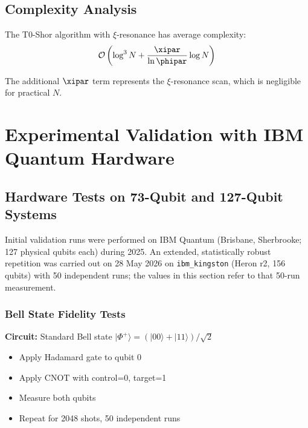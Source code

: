 \subsection{Complexity Analysis}

\begin{proposition}
	The T0-Shor algorithm with $\xi$-resonance has average complexity:
	\begin{equation}
		\mathcal{O}\left(\log^3 N + \frac{\xipar}{\ln \phipar} \log N\right)
	\end{equation}
\end{proposition}

The additional $\xipar$ term represents the $\xi$-resonance scan, which is negligible for practical $N$.

\section{Experimental Validation with IBM Quantum Hardware}
\label{sec:ibm_validation}

\subsection{Hardware Tests on 73-Qubit and 127-Qubit Systems}

Initial validation runs were performed on IBM Quantum (Brisbane, Sherbrooke; 127 physical qubits each) during 2025. An extended, statistically robust repetition was carried out on 28 May 2026 on \texttt{ibm\_kingston} (Heron r2, 156 qubits) with 50 independent runs; the values in this section refer to that 50-run measurement.

\subsubsection{Bell State Fidelity Tests}

\begin{experimentbox}
	\textbf{Circuit:} Standard Bell state $|\Phi^+\rangle = (|00\rangle + |11\rangle)/\sqrt{2}$
	\begin{itemize}
		\item Apply Hadamard gate to qubit 0
		\item Apply CNOT with control=0, target=1
		\item Measure both qubits
		\item Repeat for 2048 shots, 50 independent runs
	\end{itemize}
\end{experimentbox}

